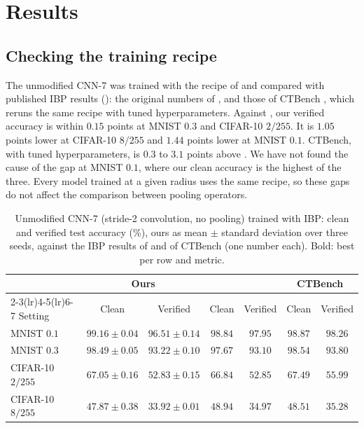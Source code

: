 \section{Results}
\label{sec:results}

\subsection{Checking the training recipe}

The unmodified CNN-7 was trained with the recipe of  and compared with published IBP results (): the original numbers of \citet{shi2021}, and those of CTBench \cite{mao2024ctbench}, which reruns the same recipe with tuned hyperparameters. Against \citet{shi2021}, our verified accuracy is within $0.15$ points at MNIST $0.3$ and CIFAR-10 $2/255$. It is $1.05$ points lower at CIFAR-10 $8/255$ and $1.44$ points lower at MNIST $0.1$. CTBench, with tuned hyperparameters, is $0.3$ to $3.1$ points above \citet{shi2021}. We have not found the cause of the gap at MNIST $0.1$, where our clean accuracy is the highest of the three. Every model trained at a given radius uses the same recipe, so these gaps do not affect the comparison between pooling operators.

\begin{table}[h]
\centering
\caption{Unmodified CNN-7 (stride-2 convolution, no pooling) trained with IBP: clean and verified test accuracy (\%), ours as mean $\pm$ standard deviation over three seeds, against the IBP results of \citet{shi2021} and of CTBench \cite{mao2024ctbench} (one number each). Bold: best per row and metric.}
\label{tab:ref}
\begin{tabular}{lcccccc}
\toprule
 & \multicolumn{2}{c}{Ours} & \multicolumn{2}{c}{\citet{shi2021}} & \multicolumn{2}{c}{CTBench} \\
\cmidrule(lr){2-3}\cmidrule(lr){4-5}\cmidrule(lr){6-7}
Setting & Clean & Verified & Clean & Verified & Clean & Verified \\
\midrule
MNIST $0.1$ & $\mathbf{99.16\pm0.04}$ & $96.51\pm0.14$ & $98.84$ & $97.95$ & $98.87$ & $\mathbf{98.26}$ \\
MNIST $0.3$ & $98.49\pm0.05$ & $93.22\pm0.10$ & $97.67$ & $93.10$ & $\mathbf{98.54}$ & $\mathbf{93.80}$ \\
CIFAR-10 $2/255$ & $67.05\pm0.16$ & $52.83\pm0.15$ & $66.84$ & $52.85$ & $\mathbf{67.49}$ & $\mathbf{55.99}$ \\
CIFAR-10 $8/255$ & $47.87\pm0.38$ & $33.92\pm0.01$ & $\mathbf{48.94}$ & $34.97$ & $48.51$ & $\mathbf{35.28}$ \\
\bottomrule
\end{tabular}
\end{table}

